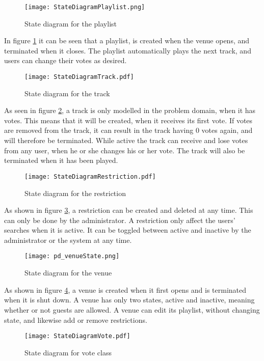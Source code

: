 \begin{figure}[H]
  \centering
  \texttt{[image: StateDiagramPlaylist.png]}
  \caption{State diagram for the playlist}\label{fig:StateDiagramPlaylist}
\end{figure}

In figure \cref{fig:StateDiagramPlaylist} it can be seen that a playlist, is created when the venue opens, and terminated when it closes. The playlist automatically plays the next track, and users can change their votes as desired.

\begin{figure}[H]
  \centering
  \texttt{[image: StateDiagramTrack.pdf]}
  \caption{State diagram for the track}\label{fig:StateDiagramTrack}
\end{figure}

As seen in figure \cref{fig:StateDiagramTrack}, a track is only modelled in the problem domain, when it has votes. This means that it will be created, when it receives its first vote. If votes are removed from the track, it can result in the track having 0 votes again, and will therefore be terminated. While active the track can receive and lose votes from any user, when he or she changes his or her vote. The track will also be terminated when it has been played.

\begin{figure}[H]
  \centering
  \texttt{[image: StateDiagramRestriction.pdf]}
  \caption{State diagram for the restriction}\label{fig:StateDiagramRestriction}
\end{figure}

As shown in figure \cref{fig:StateDiagramRestriction}, a restriction can be created and deleted at any time. This can only be done by the administrator. A restriction only affect the users' searches when it is active. It can be toggled between active and inactive by the administrator or the system at any time.

\begin{figure}[H]
  \centering
  \texttt{[image: pd\_venueState.png]}
  \caption{State diagram for the venue}\label{fig:StateDiagramVenue}
\end{figure}

As shown in figure \cref{fig:StateDiagramVenue}, a venue is created when it first opens and is terminated when it is shut down. A venue has only two states, active and inactive, meaning whether or not guests are allowed. A venue can edit its playlist, without changing state, and likewise add or remove restrictions.

\begin{figure}[H]
  \centering
  \texttt{[image: StateDiagramVote.pdf]}
  \caption{State diagram for vote class}\label{fig:StateDiagramVote}
\end{figure}
